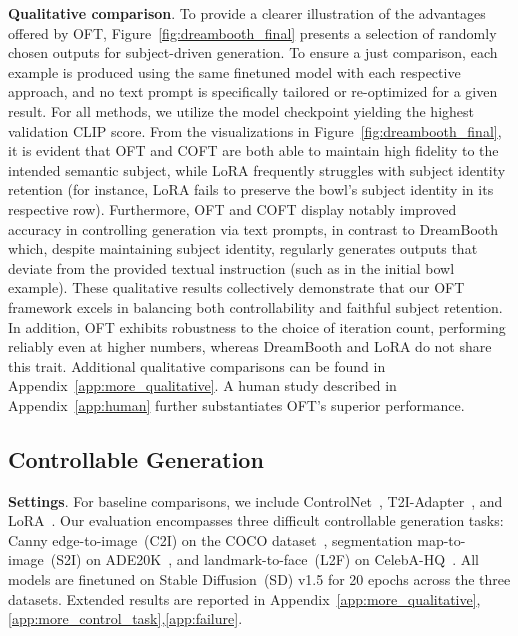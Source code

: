 \textbf{Qualitative comparison}. To provide a clearer illustration of the advantages offered by OFT, Figure~\ref{fig:dreambooth_final} presents a selection of randomly chosen outputs for subject-driven generation. To ensure a just comparison, each example is produced using the same finetuned model with each respective approach, and no text prompt is specifically tailored or re-optimized for a given result. For all methods, we utilize the model checkpoint yielding the highest validation CLIP score. From the visualizations in Figure~\ref{fig:dreambooth_final}, it is evident that OFT and COFT are both able to maintain high fidelity to the intended semantic subject, while LoRA frequently struggles with subject identity retention (for instance, LoRA fails to preserve the bowl’s subject identity in its respective row). Furthermore, OFT and COFT display notably improved accuracy in controlling generation via text prompts, in contrast to DreamBooth which, despite maintaining subject identity, regularly generates outputs that deviate from the provided textual instruction (such as in the initial bowl example). These qualitative results collectively demonstrate that our OFT framework excels in balancing both controllability and faithful subject retention. In addition, OFT exhibits robustness to the choice of iteration count, performing reliably even at higher numbers, whereas DreamBooth and LoRA do not share this trait. Additional qualitative comparisons can be found in Appendix~\ref{app:more_qualitative}. A human study described in Appendix~\ref{app:human} further substantiates OFT’s superior performance.

\subsection{Controllable Generation}

\textbf{Settings}. For baseline comparisons, we include ControlNet~\cite{zhang2023adding}, T2I-Adapter~\cite{mou2023t2i}, and LoRA~\cite{hulora2022}. Our evaluation encompasses three difficult controllable generation tasks: Canny edge-to-image~(C2I) on the COCO dataset~\cite{lin2014microsoft}, segmentation map-to-image~(S2I) on ADE20K~\cite{zhou2017scene}, and landmark-to-face~(L2F) on CelebA-HQ~\cite{karras2018progressive,xia2021tedigan}. All models are finetuned on Stable Diffusion~(SD) v1.5 for 20 epochs across the three datasets. Extended results are reported in Appendix~\ref{app:more_qualitative},\ref{app:more_control_task},\ref{app:failure}.

